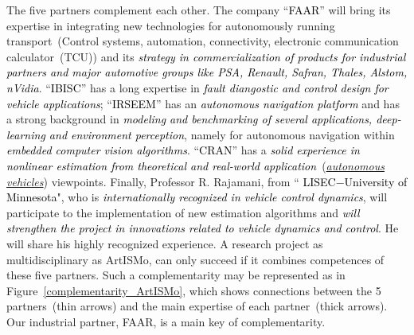 \documentclass[a4paper,11pt]{article}
\begin{document}
The five partners complement each other. The company ``\textcolor{black}{FAAR}'' will bring its expertise in integrating new technologies for autonomously running transport~(Control systems, automation, connectivity, electronic communication calculator~(TCU)) and its \textcolor{black}{\it strategy in commercialization of products for industrial partners and major automotive groups like PSA, Renault, Safran, Thales, Alstom, nVidia}. ``\textcolor{black}{IBISC}'' has a long expertise in \textcolor{black}{\it fault diangostic and control design for vehicle applications}; ``\textcolor{black}{IRSEEM}'' has an \textcolor{black}{\it autonomous navigation platform} and has a strong background in \textcolor{black}{\it modeling and benchmarking of  several applications, deep-learning and environment perception}, namely for autonomous navigation within \textcolor{black}{\it embedded computer vision algorithms}. ``\textcolor{black}{CRAN}'' has a \textcolor{black}{\it solid experience in nonlinear estimation from theoretical and real-world application}~(\underline{\it autonomous vehicles}) viewpoints. Finally, Professor R. {\sc Rajamani}, from `` \textcolor{black}{LISEC$-$University of Minnesota}", who is \textcolor{black}{\it internationally recognized in vehicle control dynamics}, will participate to the implementation of new estimation algorithms and \textcolor{black}{\it will strengthen the project in innovations related to vehicle dynamics and control}. He will share his highly recognized experience. A research project as multidisciplinary as {ArtISMo}, can only succeed if it combines competences of these five partners. Such a complementarity may be represented as in Figure~\ref{complementarity_ArtISMo}, which shows connections between the 5 partners~(thin arrows) and the main expertise of each partner~(thick arrows). Our industrial partner, FAAR, is a main key of complementarity. %

\end{document}
